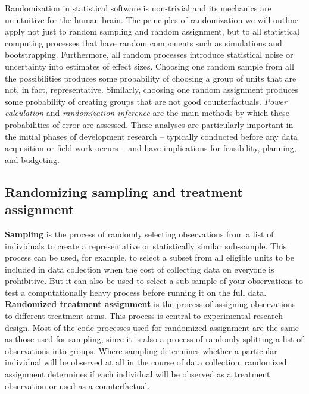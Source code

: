 Randomization in statistical software is non-trivial
and its mechanics are unintuitive for the human brain.
The principles of randomization we will outline
apply not just to random sampling and random assignment,
but to all statistical computing processes that have random components
such as simulations and bootstrapping.
Furthermore, all random processes introduce statistical noise
or uncertainty into estimates of effect sizes.
Choosing one random sample from all the possibilities produces some probability of
choosing a group of units that are not, in fact, representative.
Similarly, choosing one random assignment produces some probability of
creating groups that are not good counterfactuals.
\textit{Power calculation} and \textit{randomization inference}
are the main methods by which these probabilities of error are assessed.
These analyses are particularly important in the initial phases of development research --
typically conducted before any data acquisition or field work occurs --
and have implications for feasibility, planning, and budgeting.

\subsection{Randomizing sampling and treatment assignment}

\textbf{Sampling} is the process of randomly selecting observations
from a list of individuals to create a representative or statistically similar sub-sample.
This process can be used, for example, to select a subset from all eligible units
to be included in data collection when the cost of collecting data on everyone is prohibitive.
But it can also be used to select a sub-sample of your observations to test a computationally heavy process
before running it on the full data.
\textbf{Randomized treatment assignment} is the process of assigning observations to different treatment arms.
This process is central to experimental research design.
Most of the code processes used for randomized assignment are the same as those used for sampling,
since it is also a process of randomly splitting a list of observations into groups.
Where sampling determines whether a particular individual
will be observed at all in the course of data collection,
randomized assignment determines if each individual will be observed
as a treatment observation or used as a counterfactual.

